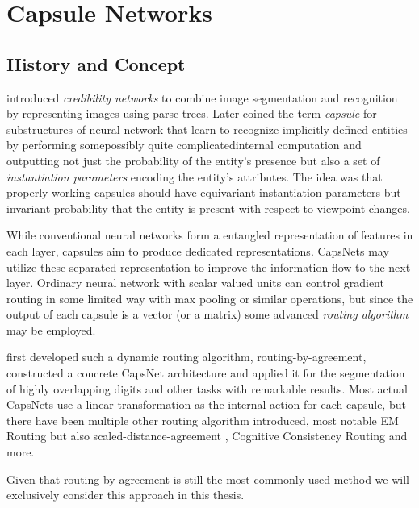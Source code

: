 
\section{Capsule Networks}
\label{sec:capsules}

\subsection{History and Concept}

\citet{parse} introduced \emph{credibility networks} to combine image segmentation and recognition by representing images using parse trees.
Later \citet{transformingauto} coined the term \emph{capsule} for substructures of neural network that learn to recognize implicitly defined entities by performing some\textemdash possibly quite complicated\textemdash internal computation and outputting not just the probability of the entity's presence but also a set of \emph{instantiation parameters} encoding the entity's attributes.
The idea was that properly working capsules should have equivariant instantiation parameters but invariant probability that the entity is present with respect to viewpoint changes.

While conventional neural networks form a entangled representation of features in each layer, capsules aim to produce dedicated representations.
CapsNets may utilize these separated representation to improve the information flow to the next layer.
Ordinary neural network with scalar valued units can control gradient routing in some limited way with max pooling or similar operations, but since the output of each capsule is a vector (or a matrix) some advanced \emph{routing algorithm} may be employed.

\citet{capsules} first developed such a dynamic routing algorithm, routing-by-agreement, constructed a concrete CapsNet architecture and applied it for the segmentation of highly overlapping digits and other tasks with remarkable results.
Most actual CapsNets use a linear transformation as the internal action for each capsule, but there have been multiple other routing algorithm introduced, most notable EM Routing \citep{em} but also scaled-distance-agreement \citep{scaledagreement}, Cognitive Consistency Routing \citep{cognitive} and more.

Given that routing-by-agreement is still the most commonly used method we will exclusively consider this approach in this thesis.


